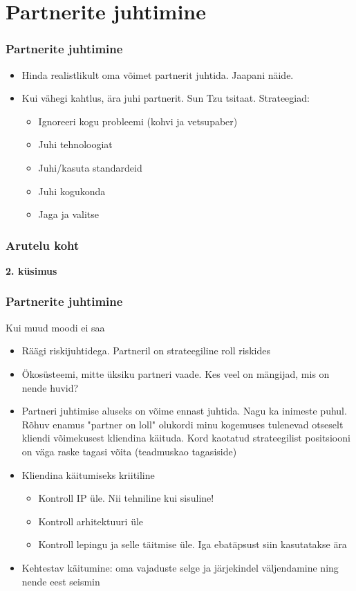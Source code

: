 \section{Partnerite juhtimine}
\begin{frame}[fragile]
  \frametitle{Partnerite juhtimine}
	\begin{itemize}
		\item Hinda realistlikult oma võimet partnerit juhtida. Jaapani näide. 
		\item Kui vähegi kahtlus, ära juhi partnerit. Sun Tzu tsitaat. Strateegiad:
			\begin{itemize}
				\item Ignoreeri kogu probleemi (kohvi ja vetsupaber)
				\item Juhi tehnoloogiat
				\item Juhi/kasuta standardeid
				\item Juhi kogukonda
				\item Jaga ja valitse
			\end{itemize}
	\end{itemize}
\end{frame}

\begin{frame}[fragile]
  \frametitle{Arutelu koht}
		\begin{center}
			\textbf{2. küsimus}
		\end{center}
\end{frame}

\begin{frame}[fragile]
  \frametitle{Partnerite juhtimine}
  Kui muud moodi ei saa
	\begin{itemize}
		\item Räägi riskijuhtidega. Partneril on strateegiline roll riskides
		\item Ökosüsteemi, mitte üksiku partneri vaade. Kes veel on mängijad, mis on nende huvid?
		\item Partneri juhtimise aluseks on võime ennast juhtida. Nagu ka inimeste puhul. Rõhuv enamus "partner on loll" olukordi minu kogemuses tulenevad otseselt kliendi võimekusest kliendina käituda. Kord kaotatud strateegilist positsiooni on väga raske tagasi võita (teadmuskao tagasiside)
		\item Kliendina käitumiseks kriitiline
			\begin{itemize}
				\item Kontroll IP üle. Nii tehniline kui sisuline!
				\item Kontroll arhitektuuri üle
				\item Kontroll lepingu ja selle täitmise üle. Iga ebatäpsust siin kasutatakse ära
			\end{itemize}		
		\item Kehtestav käitumine: oma vajaduste selge ja järjekindel väljendamine ning nende eest seismin
	\end{itemize}
\end{frame}


